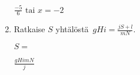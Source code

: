 \documentclass[finnish, a4paper, 12pt]{article}
\begin{document}
\begin{enumerate}[leftmargin=*]
		\begin{version:withAnswers}
		\(\frac{-5}{6} \text{  tai } x = -2\)
		\end{version:withAnswers}
		\vspace{8pt}
		
		\item %
		Ratkaise \(S\) yhtälöstä 
		\(
		\displaystyle \,
		gHi = \frac{jS+l}{mN} .
		\)	
		
		\(
		S = 
		\) %
		\begin{version:withAnswers}
		\( \frac{gHimN}{j}\)
		\end{version:withAnswers}
		
	\end{enumerate}
	
	
\end{document}
